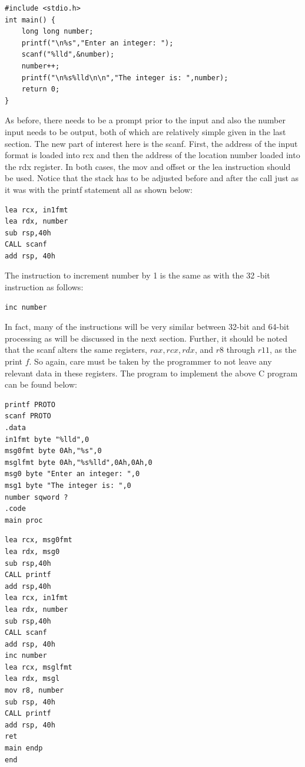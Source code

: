 \documentclass[10pt]{article}
\begin{document}
\begin{verbatim}
#include <stdio.h>
int main() {
    long long number;
    printf("\n%s","Enter an integer: ");
    scanf("%lld",&number);
    number++;
    printf("\n%s%lld\n\n","The integer is: ",number);
    return 0;
}
\end{verbatim}

As before, there needs to be a prompt prior to the input and also the number input needs to be output, both of which are relatively simple given in the last section. The new part of interest here is the scanf. First, the address of the input format is loaded into rcx and then the address of the location number loaded into the rdx register. In both cases, the mov and offset or the lea instruction should be used. Notice that the stack has to be adjusted before and after the call just as it was with the printf statement all as shown below:

\begin{verbatim}
lea rcx, in1fmt
lea rdx, number
sub rsp,40h
CALL scanf
add rsp, 40h
\end{verbatim}

The instruction to increment number by 1 is the same as with the 32 -bit instruction as follows:

\begin{verbatim}
inc number
\end{verbatim}

In fact, many of the instructions will be very similar between 32-bit and 64-bit processing as will be discussed in the next section. Further, it should be noted that the scanf alters the same registers, $r a x, r c x, r d x$, and $r 8$ through $r 11$, as the print $f$. So again, care must be taken by the programmer to not leave any relevant data in these registers. The program to implement the above C program can be found below:

\begin{verbatim}
printf PROTO
scanf PROTO
.data
in1fmt byte "%lld",0
msg0fmt byte 0Ah,"%s",0
msglfmt byte 0Ah,"%s%lld",0Ah,0Ah,0
msg0 byte "Enter an integer: ",0
msg1 byte "The integer is: ",0
number sqword ?
.code
main proc
\end{verbatim}

\begin{verbatim}
lea rcx, msg0fmt
lea rdx, msg0
sub rsp,40h
CALL printf
add rsp,40h
lea rcx, in1fmt
lea rdx, number
sub rsp,40h
CALL scanf
add rsp, 40h
inc number
lea rcx, msglfmt
lea rdx, msgl
mov r8, number
sub rsp, 40h
CALL printf
add rsp, 40h
ret
main endp
end
\end{verbatim}
\end{document}
